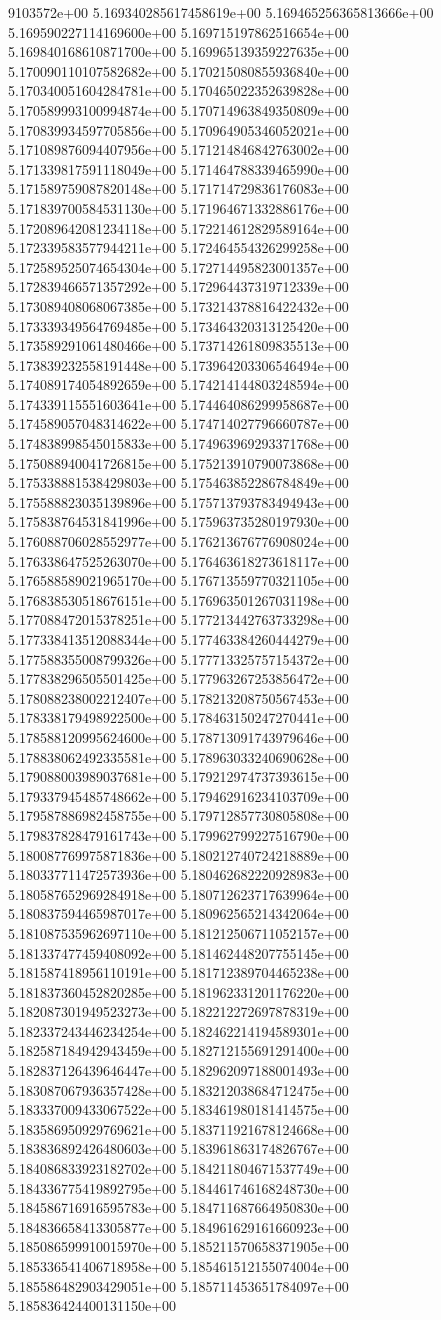 9103572e+00	5.169340285617458619e+00	5.169465256365813666e+00	5.169590227114169600e+00	5.169715197862516654e+00	5.169840168610871700e+00	5.169965139359227635e+00	5.170090110107582682e+00	5.170215080855936840e+00	5.170340051604284781e+00	5.170465022352639828e+00	5.170589993100994874e+00	5.170714963849350809e+00	5.170839934597705856e+00	5.170964905346052021e+00	5.171089876094407956e+00	5.171214846842763002e+00	5.171339817591118049e+00	5.171464788339465990e+00	5.171589759087820148e+00	5.171714729836176083e+00	5.171839700584531130e+00	5.171964671332886176e+00	5.172089642081234118e+00	5.172214612829589164e+00	5.172339583577944211e+00	5.172464554326299258e+00	5.172589525074654304e+00	5.172714495823001357e+00	5.172839466571357292e+00	5.172964437319712339e+00	5.173089408068067385e+00	5.173214378816422432e+00	5.173339349564769485e+00	5.173464320313125420e+00	5.173589291061480466e+00	5.173714261809835513e+00	5.173839232558191448e+00	5.173964203306546494e+00	5.174089174054892659e+00	5.174214144803248594e+00	5.174339115551603641e+00	5.174464086299958687e+00	5.174589057048314622e+00	5.174714027796660787e+00	5.174838998545015833e+00	5.174963969293371768e+00	5.175088940041726815e+00	5.175213910790073868e+00	5.175338881538429803e+00	5.175463852286784849e+00	5.175588823035139896e+00	5.175713793783494943e+00	5.175838764531841996e+00	5.175963735280197930e+00	5.176088706028552977e+00	5.176213676776908024e+00	5.176338647525263070e+00	5.176463618273618117e+00	5.176588589021965170e+00	5.176713559770321105e+00	5.176838530518676151e+00	5.176963501267031198e+00	5.177088472015378251e+00	5.177213442763733298e+00	5.177338413512088344e+00	5.177463384260444279e+00	5.177588355008799326e+00	5.177713325757154372e+00	5.177838296505501425e+00	5.177963267253856472e+00	5.178088238002212407e+00	5.178213208750567453e+00	5.178338179498922500e+00	5.178463150247270441e+00	5.178588120995624600e+00	5.178713091743979646e+00	5.178838062492335581e+00	5.178963033240690628e+00	5.179088003989037681e+00	5.179212974737393615e+00	5.179337945485748662e+00	5.179462916234103709e+00	5.179587886982458755e+00	5.179712857730805808e+00	5.179837828479161743e+00	5.179962799227516790e+00	5.180087769975871836e+00	5.180212740724218889e+00	5.180337711472573936e+00	5.180462682220928983e+00	5.180587652969284918e+00	5.180712623717639964e+00	5.180837594465987017e+00	5.180962565214342064e+00	5.181087535962697110e+00	5.181212506711052157e+00	5.181337477459408092e+00	5.181462448207755145e+00	5.181587418956110191e+00	5.181712389704465238e+00	5.181837360452820285e+00	5.181962331201176220e+00	5.182087301949523273e+00	5.182212272697878319e+00	5.182337243446234254e+00	5.182462214194589301e+00	5.182587184942943459e+00	5.182712155691291400e+00	5.182837126439646447e+00	5.182962097188001493e+00	5.183087067936357428e+00	5.183212038684712475e+00	5.183337009433067522e+00	5.183461980181414575e+00	5.183586950929769621e+00	5.183711921678124668e+00	5.183836892426480603e+00	5.183961863174826767e+00	5.184086833923182702e+00	5.184211804671537749e+00	5.184336775419892795e+00	5.184461746168248730e+00	5.184586716916595783e+00	5.184711687664950830e+00	5.184836658413305877e+00	5.184961629161660923e+00	5.185086599910015970e+00	5.185211570658371905e+00	5.185336541406718958e+00	5.185461512155074004e+00	5.185586482903429051e+00	5.185711453651784097e+00	5.185836424400131150e+00